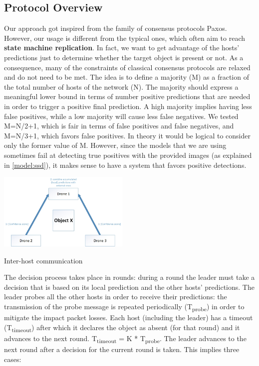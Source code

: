 \documentclass[10pt,conference,compsocconf]{IEEEtran}
\begin{document}
\subsection{Protocol Overview}
\label{subsec:protooverview}
Our approach got inspired from the family of consensus protocols Paxos. However, our usage is different from the typical ones, which often aim to reach \textbf{state machine replication}. In fact, we want to get advantage of the hosts' predictions just to determine whether the target object is present or not. As a consequence, many of the constraints of classical consensus protocols are relaxed and do not need to be met. The idea is to define a majority (M) as a fraction of the total number of hosts of the network (N). The majority should express a meaningful lower bound in terms of number positive predictions that are needed in order to trigger a positive final prediction. A high majority implies having less false positives, while a low majority will cause less false negatives. We tested M=N/2+1, which is fair in terms of false positives and false negatives, and M=N/3+1, which favors false positives. In theory it would be logical to consider only the former value of M. However, since the models that we are using sometimes fail at detecting true positives with the provided images (as explained in \ref{model:ssd}), it makes sense to have a system that favors positive detections.
\begin{center}
	\captionsetup{type=figure}
	\includegraphics[width=0.47\textwidth]{img/protocol_sketch_inter_host.jpg}
	\caption {Inter-host communication}
	\label{fig:inter_host}
\end{center}
The decision process takes place in rounds: during a round the leader must take a decision that is based on its local prediction and the other hosts' predictions. The leader probes all the other hosts in order to receive their predictions: the transmission of the probe message is repeated periodically (T\textsubscript{probe}) in order to mitigate the impact packet losses. Each host (including the leader) has a timeout (T\textsubscript{timeout}) after which it declares the object as absent (for that round) and it advances to the next round. T\textsubscript{timeout} = K * T\textsubscript{probe}. The leader advances to the next round after a decision for the current round is taken. This implies three cases:
\end{document}
